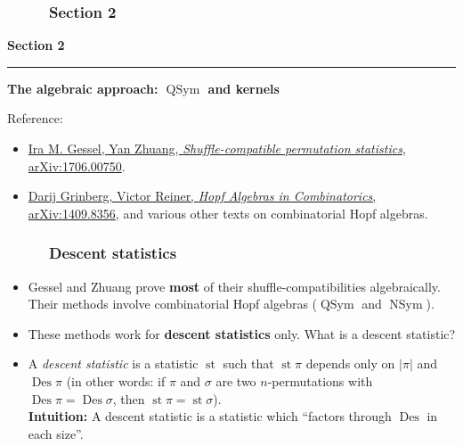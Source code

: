 \documentclass{beamer}
\newcommand{\red}{\color{red}}
\newcommand{\Des}{\operatorname{Des}}
\newcommand{\st}{\operatorname{st}}
\newcommand{\QSym}{\operatorname{QSym}}
\newcommand{\NSym}{\operatorname{NSym}}
\newcommand{\fti}[1]{\frametitle{\ \ \ \ \ #1}}
\newcommand{\abs}[1]{\left| #1 \right|}
\newcommand{\defn}[1]{{\color{darkred}\emph{#1}}} %
\theoremstyle{plain}
\begin{document}
\begin{frame}
\fti{Section 2}
\begin{center}
{\LARGE \bf Section 2} \\
\noindent\rule[0.5ex]{\linewidth}{1pt}
{\Large \bf The algebraic approach: $\QSym$ and kernels}
\end{center}
\vspace{1cm}
Reference:
\begin{itemize}
\item \href{https://arxiv.org/abs/1706.00750}{\red Ira M. Gessel, Yan Zhuang, \textit{Shuffle-compatible permutation statistics}, arXiv:1706.00750}.
\item \href{http://arxiv.org/abs/1409.8356}{\red Darij Grinberg, Victor Reiner, \textit{Hopf Algebras in Combinatorics}, arXiv:1409.8356},
      and various other texts on combinatorial Hopf algebras.
\end{itemize}
\end{frame}

\begin{frame}
\fti{Descent statistics}

\begin{itemize}

\item Gessel and Zhuang prove \textbf{most} of their shuffle-compatibilities
      algebraically. Their methods involve combinatorial Hopf
      algebras ($\QSym$ and $\NSym$).

\item These methods work for \textbf{descent statistics} only.
      What is a descent statistic?

\pause

\item A \defn{descent statistic} is a statistic $\st$ such that
      $\st \pi$ depends only on $\abs{\pi}$ and $\Des\pi$
      (in other words: if $\pi$ and $\sigma$ are two
      $n$-permutations with $\Des\pi = \Des\sigma$, then
      $\st\pi = \st\sigma$). \\
      \textbf{Intuition:} A descent statistic is a statistic
      which ``factors through $\Des$ in each size''.

\end{itemize}
\end{frame}
\end{document}
